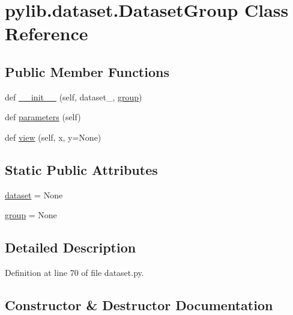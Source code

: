\hypertarget{classpylib_1_1dataset_1_1DatasetGroup}{}\section{pylib.\+dataset.\+Dataset\+Group Class Reference}
\label{classpylib_1_1dataset_1_1DatasetGroup}
\subsection*{Public Member Functions}
\begin{DoxyCompactItemize}
\item 
def \hyperlink{classpylib_1_1dataset_1_1DatasetGroup_aa09aa3f636b2fb9dadaab650a0de6b91}{\+\_\+\+\_\+init\+\_\+\+\_\+} (self, dataset\+\_\+, \hyperlink{classpylib_1_1dataset_1_1DatasetGroup_a216c1c036170c5ed19b22f19652fd8fd}{group})
\item 
def \hyperlink{classpylib_1_1dataset_1_1DatasetGroup_aa78e132c474f11184b700c4dc8ab6934}{parameters} (self)
\item 
def \hyperlink{classpylib_1_1dataset_1_1DatasetGroup_ac88cf2372415abaee0900af0b2a94cbb}{view} (self, x, y=None)
\end{DoxyCompactItemize}
\subsection*{Static Public Attributes}
\begin{DoxyCompactItemize}
\item 
\hyperlink{classpylib_1_1dataset_1_1DatasetGroup_a7ca4d83cc9dc0b5a1e47601dcdf94cd9}{dataset} = None
\item 
\hyperlink{classpylib_1_1dataset_1_1DatasetGroup_a216c1c036170c5ed19b22f19652fd8fd}{group} = None
\end{DoxyCompactItemize}


\subsection{Detailed Description}


Definition at line 70 of file dataset.\+py.



\subsection{Constructor \& Destructor Documentation}
